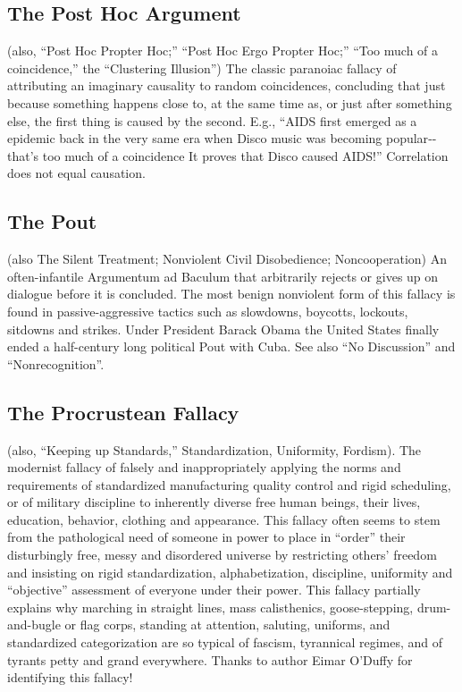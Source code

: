\documentclass[10pt,a4paper,british]{article}
\begin{document}
\begin{multicols}{2}
    \subsection{The Post Hoc Argument} (also, ``Post Hoc Propter Hoc;''  ``Post Hoc Ergo Propter Hoc;'' ``Too much of a coincidence,'' the ``Clustering Illusion'') The classic paranoiac fallacy of attributing an imaginary causality to random coincidences, concluding that just because something happens close to, at the same time as, or just after something else, the first thing is caused by the second. E.g., ``AIDS first emerged as a epidemic back in the very same era when Disco music was becoming popular{-}{-}that's too much of a coincidence It proves that Disco caused AIDS!''  Correlation does not equal causation.  

    \subsection{The Pout} (also The Silent Treatment; Nonviolent Civil Disobedience; Noncooperation) An often{-}infantile Argumentum ad Baculum that arbitrarily rejects or gives up on dialogue before it is concluded.  The most benign nonviolent form of this fallacy is found in passive{-}aggressive tactics such as slowdowns, boycotts, lockouts, sitdowns and strikes.  Under President Barack Obama the United States finally ended a half{-}century long political Pout with Cuba. See also ``No Discussion'' and ``Nonrecognition''.  

	\subsection{The Procrustean Fallacy} (also, ``Keeping up Standards,'' Standardization, Uniformity, Fordism).  The modernist fallacy of falsely and inappropriately applying the norms and requirements of standardized manufacturing  quality control and rigid scheduling, or of military discipline to inherently diverse free human beings, their lives, education, behavior, clothing and appearance. This fallacy often seems to stem from the pathological need of someone in power to place in ``order'' their disturbingly free, messy and disordered universe by restricting others' freedom and insisting on rigid standardization, alphabetization, discipline, uniformity and ``objective'' assessment of everyone under their power. This fallacy partially explains why marching in straight lines, mass calisthenics, goose{-}stepping, drum{-}and{-}bugle or flag corps, standing at attention, saluting, uniforms, and standardized categorization are so typical of fascism, tyrannical regimes, and of tyrants petty and grand everywhere. Thanks to author Eimar O'Duffy for identifying this fallacy!  


\end{multicols}
\end{document}
